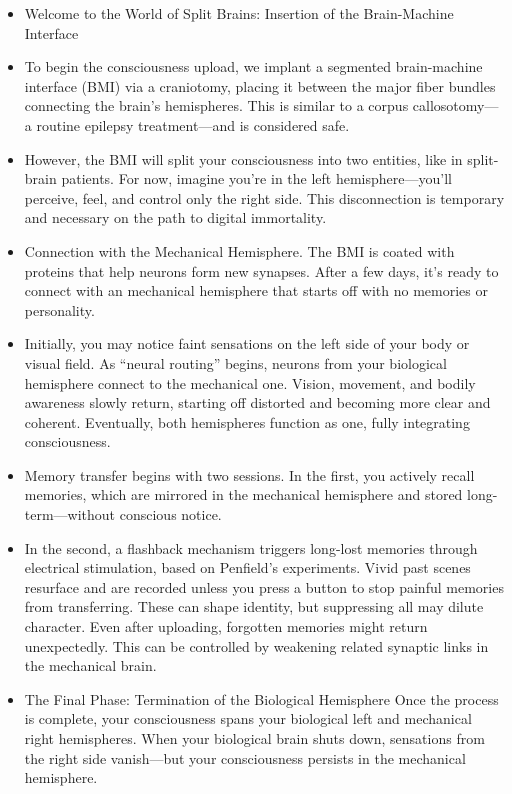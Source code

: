 \documentclass[10pt]{article}
\begin{document}
\begin{sloppypar}
\begin{itemize}
    \item Welcome to the World of Split Brains: Insertion of the Brain-Machine Interface
    \item To begin the consciousness upload, we implant a segmented brain-machine interface (BMI) via a craniotomy, placing it between the major fiber bundles connecting the brain’s hemispheres. This is similar to a corpus callosotomy—a routine epilepsy treatment—and is considered safe.
    \item However, the BMI will split your consciousness into two entities, like in split-brain patients. For now, imagine you’re in the left hemisphere—you’ll perceive, feel, and control only the right side. This disconnection is temporary and necessary on the path to digital immortality.
    \item Connection with the Mechanical Hemisphere. The BMI is coated with proteins that help neurons form new synapses. After a few days, it’s ready to connect with an mechanical hemisphere that starts off with no memories or personality.
    \item Initially, you may notice faint sensations on the left side of your body or visual field. As “neural routing” begins, neurons from your biological hemisphere connect to the mechanical one. Vision, movement, and bodily awareness slowly return, starting off distorted and becoming more clear and coherent. Eventually, both hemispheres function as one, fully integrating consciousness.
    \item Memory transfer begins with two sessions. In the first, you actively recall memories, which are mirrored in the mechanical hemisphere and stored long-term—without conscious notice.
    \item In the second, a flashback mechanism triggers long-lost memories through electrical stimulation, based on Penfield’s experiments. Vivid past scenes resurface and are recorded unless you press a button to stop painful memories from transferring. These can shape identity, but suppressing all may dilute character. Even after uploading, forgotten memories might return unexpectedly. This can be controlled by weakening related synaptic links in the mechanical brain.
    \item The Final Phase: Termination of the Biological Hemisphere Once the process is complete, your consciousness spans your biological left and mechanical right hemispheres. When your biological brain shuts down, sensations from the right side vanish—but your consciousness persists in the mechanical hemisphere.

\end{itemize}
\end{sloppypar}
\end{document}
